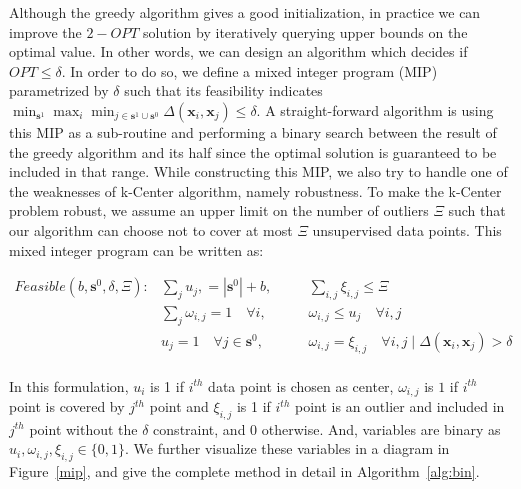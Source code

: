 \documentclass{article}
\begin{document}
Although the greedy algorithm gives a good initialization, in practice we can improve the $2-OPT$ solution by iteratively querying upper bounds on the optimal value. In other words, we can design an algorithm which decides if $OPT \leq \delta$. In order to do so, we define a mixed integer program (MIP) parametrized by $\delta$ such that its feasibility indicates $\min_{\mathbf{s}^1} \max_i \min_{j \in \mathbf{s}^1 \cup \mathbf{s}^0} \Delta(\mathbf{x}_i,\mathbf{x}_j) \leq \delta$. A straight-forward algorithm is using this MIP as a sub-routine and performing a binary search between the result of the greedy algorithm and its half since the optimal solution is guaranteed to be included in that range. While constructing this MIP, we also try to handle one of the weaknesses of k-Center algorithm, namely robustness. To make the k-Center problem robust, we assume an upper limit on the number of outliers $\Xi$ such that our algorithm can choose not to cover at most $\Xi$ unsupervised data points. This mixed integer program can be written as:

\begin{equation}
\begin{aligned}
Feasible(b,\mathbf{s}^0,\delta, \Xi):  &\sum_j  u_j, = |\mathbf{s}^0|+ b,  \quad &&  \sum_{i,j} \xi_{i,j} \leq \Xi \\
&\sum_j \omega_{i,j} = 1\quad \forall  i, \quad && \omega_{i,j} \leq u_j \quad \forall  i,j \\
   & u_j =1 \quad \forall j\in \mathbf{s}^0, \quad && \omega_{i,j} = \xi_{i,j} \quad  \forall i,j \mid   \Delta(\mathbf{x}_i,\mathbf{x}_j)  > \delta\\
\end{aligned}
\label{mipfeasible}
\end{equation}

In this formulation, $u_i$ is 1 if $i^{th}$ data point is chosen as center, $\omega_{i,j}$ is $1$ if $i^{th}$ point is covered by $j^{th}$ point and $\xi_{i,j}$ is 1 if $i^{th}$ point is an outlier and included in $j^{th}$ point without the $\delta$ constraint, and $0$ otherwise. And, variables are binary as $u_i, \omega_{i,j}, \xi_{i,j} \in \{0,1\}$. We further visualize these variables in a diagram in Figure~\ref{mip}, and give the complete method in detail in Algorithm~\ref{alg:bin}. 
\end{document}
